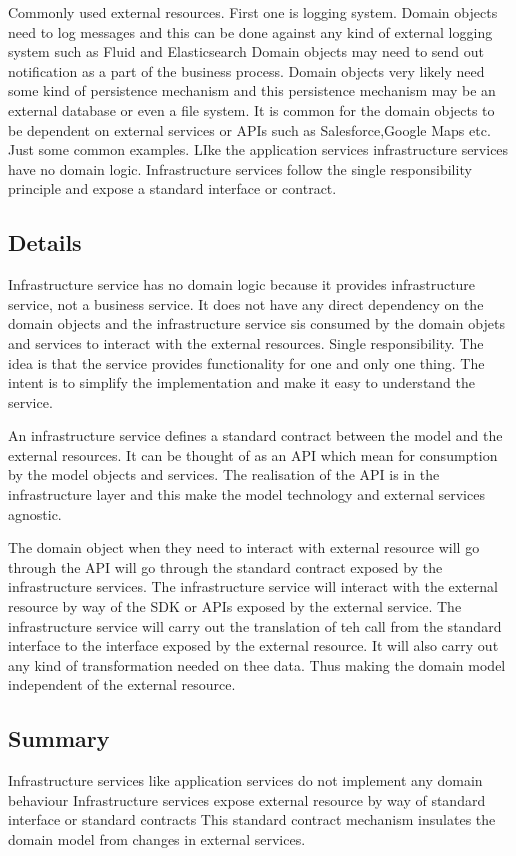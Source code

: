 Commonly used external resources.
First one is logging system.
Domain objects need to log messages and this can be done against any kind of external logging system such as Fluid and Elasticsearch
Domain objects may need to send out notification as a part of the business process.
Domain objects very likely need some kind of persistence mechanism and this persistence mechanism may be an external database or even a file system.
It is common for the domain objects to be dependent on external services or APIs such as Salesforce,Google Maps etc. Just some common examples.
LIke the application services infrastructure services have no domain logic.
Infrastructure services follow the single responsibility principle and expose a standard interface or contract.

\subsection{Details}
Infrastructure service has no domain logic because it provides infrastructure service, not a business service.
It does not have any direct dependency on the domain objects and the infrastructure service sis consumed by the domain objets and services to interact with the external resources.
Single responsibility.
The idea is that the service provides functionality for one and only one thing.
The intent is to simplify the implementation and make it easy to understand the service.

An infrastructure service defines a standard contract between the model and the external resources.
It can be thought of as an API which mean for consumption by the model objects and services.
The realisation of the API is in the infrastructure layer and this make the model technology and external services agnostic.

The domain object when they need to interact with external resource will go through the API will go through the standard contract exposed by the infrastructure services.
The infrastructure service will interact with the external resource by way of the SDK or APIs exposed by the external service.
The infrastructure service will carry out the translation of teh call from the standard interface to the interface exposed by the external resource.
It will also carry out any kind of transformation needed on thee data.
Thus making the domain model independent of the external resource.

\subsection{Summary}
Infrastructure services like application services do not implement any domain behaviour
Infrastructure services expose external resource by way of standard interface or standard contracts
This standard contract mechanism insulates the domain model from changes in external services.

